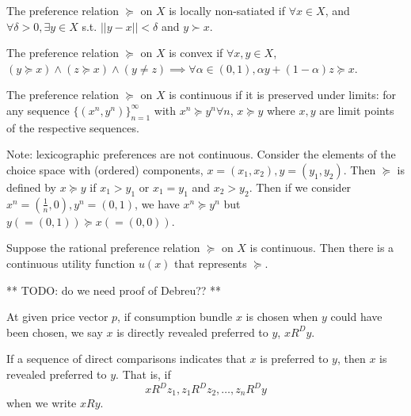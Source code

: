\begin{definition}
  The preference relation $\succeq$ on $X$ is locally non-satiated if
  $\forall x \in X$, and $\forall \delta > 0, \exists y \in X$
  s.t. $||y-x|| < \delta$ and $y \succ x$.
\end{definition}

\begin{definition}
  The preference relation $\succeq$ on $X$ is convex if $\forall x,y
  \in X$, $(y \succeq x) \wedge (z \succeq x) \wedge (y \neq z) \implies
  \forall \alpha \in (0,1), \alpha y + (1-\alpha)z \succeq x$.
\end{definition}

\begin{definition}
  The preference relation $\succeq$ on $X$ is continuous if it is
  preserved under limits: for any sequence $\{(x^n,y^n)\}_{n=1}^\infty
  $ with $x^n \succeq y^n \forall n$, $x \succeq y$ where $x, y$ are
  limit points of the respective sequences.
\end{definition}

Note: lexicographic preferences are not continuous. Consider the
elements of the choice space with (ordered) components, $x = (x_1,
x_2), y = (y_1, y_2)$. Then $\succeq$ is defined by $x \succeq y$ if
$x_1 > y_1$ or $x_1 = y_1$ and $x_2 > y_2$. Then if we consider $x^n =
(\frac{1}{n}, 0), y^n = (0, 1)$, we have $x^n \succeq y^n$ but $y (= (0,1))
\succeq x (= (0,0))$.

\begin{theorem}

  Suppose the rational preference relation $\succeq$ on $X$ is
  continuous. Then there is a continuous utility function $u(x)$ that
  represents $\succeq$.
  
\end{theorem}

** TODO: do we need proof of Debreu?? **

\begin{definition}
  At given price vector $p$, if consumption bundle $x$ is chosen when
  $y$ could have been chosen, we say $x$ is directly revealed
  preferred to $y$, $x R^D y$.
\end{definition}

\begin{definition}
  If a sequence of direct comparisons indicates that $x$ is preferred
  to $y$, then $x$ is revealed preferred to $y$. That is, if
  \[
  xR^Dz_1, z_1R^Dz_2, \dots, z_nR^Dy
  \]
  when we write $xRy$.
\end{definition}

